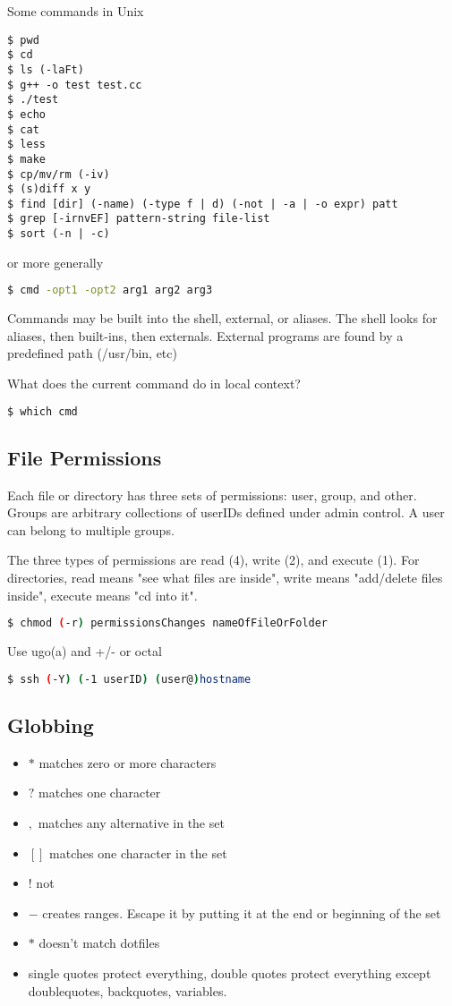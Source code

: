 \documentclass[12pt]{article}
\begin{document}
Some commands in Unix
\begin{lstlisting}
$ pwd
$ cd
$ ls (-laFt)
$ g++ -o test test.cc
$ ./test
$ echo
$ cat
$ less
$ make
$ cp/mv/rm (-iv)
$ (s)diff x y
$ find [dir] (-name) (-type f | d) (-not | -a | -o expr) patt
$ grep [-irnvEF] pattern-string file-list
$ sort (-n | -c)
\end{lstlisting}
or more generally
\begin{lstlisting}[language=bash]
$ cmd -opt1 -opt2 arg1 arg2 arg3
\end{lstlisting}

Commands may be built into the shell, external, or aliases. The shell looks for aliases, then built-ins, then externals. External programs are found by a predefined path (/usr/bin, etc)

What does the current command do in local context?
\begin{lstlisting}[language=bash]
$ which cmd
\end{lstlisting}

\subsection*{File Permissions}
Each file or directory has three sets of permissions: user, group, and other. Groups are arbitrary collections of userIDs defined under admin control. A user can belong to multiple groups.

The three types of permissions are read (4), write (2), and execute (1). For directories, read means "see what files are inside", write means "add/delete files inside", execute means "cd into it".

\begin{lstlisting}[language=bash]
$ chmod (-r) permissionsChanges nameOfFileOrFolder
\end{lstlisting}
Use ugo(a) and +/- or octal

\begin{lstlisting}[language=bash]
$ ssh (-Y) (-1 userID) (user@)hostname
\end{lstlisting}

\subsection*{Globbing}
\begin{itemize}
\item $*$ matches zero or more characters
\item $?$ matches one character
\item ${,}$ matches any alternative in the set
\item $[]$ matches one character in the set
\item $!$ not
\item $-$ creates ranges. Escape it by putting it at the end or beginning of the set
\item $*$ doesn't match dotfiles
\item single quotes protect everything, double quotes protect everything except doublequotes, backquotes, variables.
\end{itemize}
\end{document}
